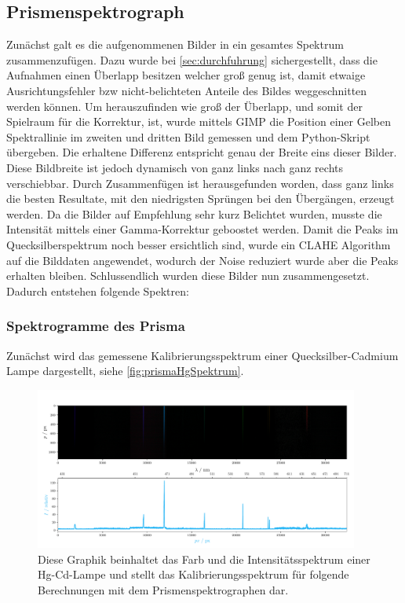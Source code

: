 \documentclass[12pt,english,ngerman]{scrartcl}
\begin{document}
\subsection{Prismenspektrograph}
Zunächst galt es die aufgenommenen Bilder in ein gesamtes Spektrum
zusammenzufügen. Dazu wurde bei \autoref{sec:durchfuhrung} sichergestellt, dass
die Aufnahmen einen Überlapp besitzen welcher groß genug ist, damit etwaige
Ausrichtungsfehler bzw nicht-belichteten Anteile des Bildes weggeschnitten
werden können. Um herauszufinden wie groß der Überlapp, und somit der Spielraum für
die Korrektur, ist, wurde mittels GIMP die Position einer Gelben Spektrallinie im
zweiten und dritten Bild gemessen und dem Python-Skript
übergeben. Die erhaltene Differenz entspricht genau der Breite eins dieser Bilder.
Diese Bildbreite ist jedoch dynamisch von ganz links nach ganz rechts
verschiebbar. Durch Zusammenfügen ist herausgefunden worden, dass ganz links
die besten Resultate, mit den niedrigsten Sprüngen bei den Übergängen, erzeugt werden.
Da die Bilder auf Empfehlung sehr kurz Belichtet wurden, musste die Intensität
mittels einer Gamma-Korrektur geboostet werden. Damit die Peaks im
Quecksilberspektrum noch besser ersichtlich sind, wurde ein CLAHE Algorithm auf die
Bilddaten angewendet, wodurch der Noise reduziert wurde aber die Peaks erhalten
bleiben. Schlussendlich wurden diese Bilder nun zusammengesetzt. Dadurch entstehen
folgende Spektren:

\subsubsection{Spektrogramme des Prisma}
Zunächst wird das gemessene Kalibrierungsspektrum einer Quecksilber-Cadmium
Lampe dargestellt, siehe \autoref{fig:prismaHgSpektrum}.

\begin{figure}[H]
	\begin{center}
		\includegraphics[width=0.95\textwidth]{figures/Hg_plot.pdf}
	\end{center}
	\caption{
		Diese Graphik beinhaltet das Farb und die Intensitätsspektrum einer
		Hg-Cd-Lampe und stellt das Kalibrierungsspektrum für folgende 
		Berechnungen mit dem Prismenspektrographen dar. 
	}\label{fig:prismaHgSpektrum}
\end{figure}
\end{document}
